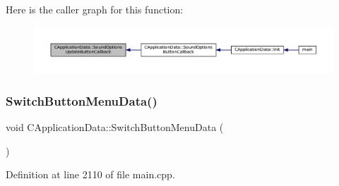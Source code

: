 Here is the caller graph for this function\+:\nopagebreak
\begin{figure}[H]
\begin{center}
\leavevmode
\includegraphics[width=350pt]{classCApplicationData_ae63c8ca19ddeb92a3aaf0a5d67d09e58_icgraph}
\end{center}
\end{figure}
\hypertarget{classCApplicationData_a2a464fd480c791ab13a1b1ca855e4578}{}\label{classCApplicationData_a2a464fd480c791ab13a1b1ca855e4578} 
\subsubsection{\texorpdfstring{Switch\+Button\+Menu\+Data()}{SwitchButtonMenuData()}}
{\footnotesize\ttfamily void C\+Application\+Data\+::\+Switch\+Button\+Menu\+Data (\begin{DoxyParamCaption}{ }\end{DoxyParamCaption})\hspace{0.3cm}{\ttfamily [protected]}}



Definition at line 2110 of file main.\+cpp.


